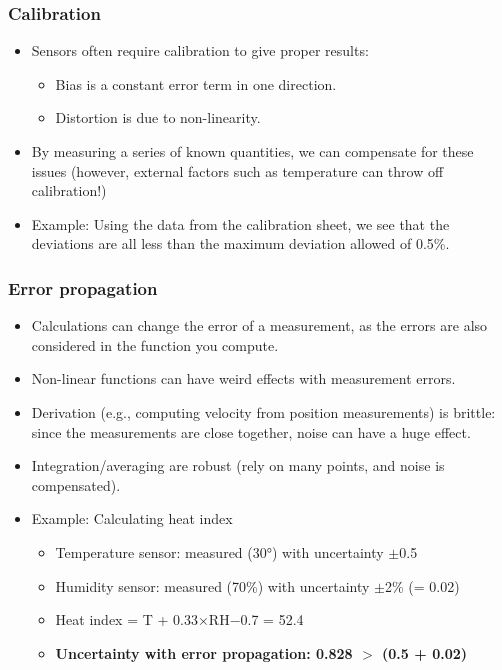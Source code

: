 \subsubsection{Calibration}

\begin{itemize}
    \item Sensors often require calibration to give proper results:
    \begin{itemize}
        \item Bias is a constant error term in one direction.
        \item Distortion is due to non-linearity.
    \end{itemize}
    
    \item By measuring a series of known quantities, we can compensate for these issues (however, external factors such as temperature can throw off calibration!)
    \item Example: Using the data from the calibration sheet, we see that the deviations are all less than the maximum deviation allowed of 0.5\%.
\end{itemize}

\subsubsection{Error propagation}
\begin{itemize}
    \item Calculations can change the error of a measurement, as the errors are also considered in the function you compute.
    \item Non-linear functions can have weird effects with measurement errors.
    \item Derivation (e.g., computing velocity from position measurements) is brittle: since the measurements are close together, noise can have a huge effect.
    \item Integration/averaging are robust (rely on many points, and noise is compensated).
    \item Example: Calculating heat index
    \begin{itemize}
        \item Temperature sensor: measured (30°) with uncertainty $\pm$0.5
        \item Humidity sensor: measured (70\%) with uncertainty $\pm$2\% (= 0.02)
        \item Heat index = T + 0.33$\times$RH$-$0.7 = 52.4
        \item \textbf{Uncertainty with error propagation: 0.828 $>$ (0.5 + 0.02)}
    \end{itemize}
\end{itemize}

